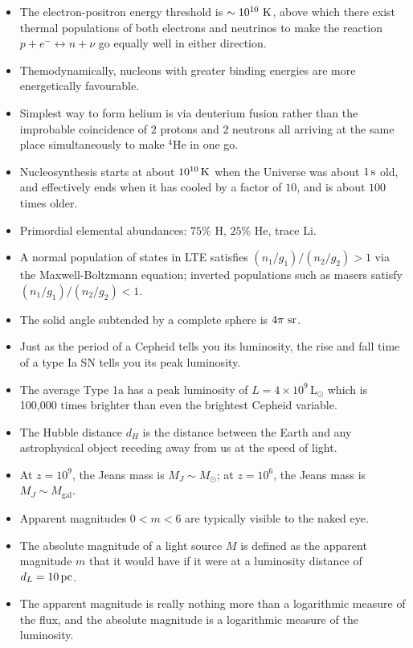 \documentclass[a4paper,11pt]{article}
\begin{document}
\begin{itemize}
    \item The electron-positron energy threshold is $\sim10^{10}~{\rm K}$, above which there exist thermal populations of both electrons and neutrinos to make the reaction $p+e^-\leftrightarrow n+\nu$ go equally well in either direction.
    \item Themodynamically, nucleons with greater binding energies are more energetically favourable.
    \item Simplest way to form helium is via deuterium fusion rather than the improbable coincidence of $2$ protons and $2$ neutrons all arriving at the same place simultaneously to make $^4$He in one go.
    \item Nucleosynthesis starts at about $10^{10}\,{\rm K}$ when the Universe was about $1\,{\rm s}$ old, and effectively ends when it has cooled by a factor of $10$, and is about $100$ times older.
    \item Primordial elemental abundances: $75\%$ H, $25\%$ He, trace Li.
    \item A normal population of states in LTE satisfies $(n_1/g_1)/(n_2/g_2)>1$ via the Maxwell-Boltzmann equation; inverted populations such as masers satisfy $(n_1/g_1)/(n_2/g_2)<1$.
    \item The solid angle subtended by a complete sphere is $4\pi~{\rm sr}$.
    \item Just as the period of a Cepheid tells you its luminosity, the rise and fall time of a type Ia SN tells you its peak luminosity.
    \item The average Type 1a has a peak luminosity of $L=4\times10^9\,\mathrm{L}_\odot$ which is 100,000 times brighter than even the brightest Cepheid variable.
    \item The Hubble distance $d_H$ is the distance between the Earth and any astrophysical object receding away from us at the speed of light.
    \item At $z=10^9$, the Jeans mass is $M_J\sim M_\odot$; at $z=10^6$, the Jeans mass is $M_J\sim M_\mathrm{gal}$.
    \item Apparent magnitudes $0<m<6$ are typically visible to the naked eye.
    \item The absolute magnitude of a light source $M$ is defined as the apparent magnitude $m$ that it would have if it were at a luminosity distance of $d_L = 10\,{\rm pc}$.
    \item The apparent magnitude is really nothing more than a logarithmic measure of the flux, and the absolute magnitude is a logarithmic measure of the luminosity.

\end{itemize}
\end{document}
